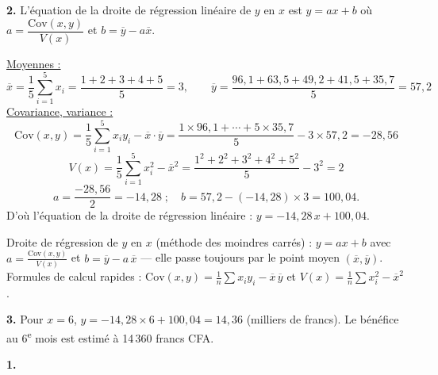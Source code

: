 \documentclass[11pt]{article}
\begin{document}
\textbf{2.} L'équation de la droite de régression linéaire de $y$ en $x$ est $y = ax + b$ où $a = \dfrac{\mathrm{Cov}(x, y)}{V(x)}$ et $b = \overline{y} - a\overline{x}$.

\underline{Moyennes :}
\[ \overline{x} = \frac{1}{5}\sum_{i=1}^5 x_i = \frac{1 + 2 + 3 + 4 + 5}{5} = 3, \qquad \overline{y} = \frac{96{,}1 + 63{,}5 + 49{,}2 + 41{,}5 + 35{,}7}{5} = 57{,}2 \]
\underline{Covariance, variance :}
\[ \mathrm{Cov}(x, y) = \frac{1}{5}\sum_{i=1}^5 x_i y_i - \overline{x}\cdot\overline{y} = \frac{1 \times 96{,}1 + \cdots + 5 \times 35{,}7}{5} - 3 \times 57{,}2 = -28{,}56 \]
\[ V(x) = \frac{1}{5}\sum_{i=1}^5 x_i^2 - \overline{x}^2 = \frac{1^2 + 2^2 + 3^2 + 4^2 + 5^2}{5} - 3^2 = 2 \]
\[ a = \frac{-28{,}56}{2} = -14{,}28 \;;\quad b = 57{,}2 - (-14{,}28) \times 3 = 100{,}04. \]
D'où l'équation de la droite de régression linéaire : $y = -14{,}28\,x + 100{,}04$.

\begin{rappel}
Droite de régression de $y$ en $x$ (méthode des moindres carrés) :
$y = ax + b$ avec $a = \frac{\mathrm{Cov}(x,y)}{V(x)}$ et
$b = \overline{y} - a\,\overline{x}$ — elle passe toujours par le point
moyen $(\overline{x}, \overline{y})$. Formules de calcul rapides :
$\mathrm{Cov}(x,y) = \frac{1}{n}\sum x_i y_i - \overline{x}\,\overline{y}$
et $V(x) = \frac{1}{n}\sum x_i^2 - \overline{x}^2$.
\end{rappel}

\textbf{3.} Pour $x = 6$, $y = -14{,}28 \times 6 + 100{,}04 = 14{,}36$ (milliers de francs). Le bénéfice au 6\textsuperscript{e} mois est estimé à 14\,360 francs CFA.

\prob{}

\textbf{1.} \begin{center}
\end{center}
\end{document}
